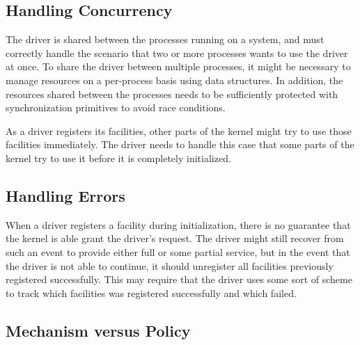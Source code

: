 

\subsection{Handling Concurrency}
The driver is shared between the processes running on a system, and must correctly handle the scenario that two or more processes wants to use the driver at once. To share the driver between multiple processes, it might be necessary to manage resources on a per-process basis using data structures. In addition, the resources shared between the processes needs to be sufficiently protected with synchronization primitives to avoid race conditions.

As a driver registers its facilities, other parts of the kernel might try to use those facilities immediately. The driver needs to handle this case that some parts of the kernel try to use it before it is completely initialized.



\subsection{Handling Errors}
When a driver registers a facility during initialization, there is no guarantee that the kernel is able grant the driver's request. The driver might still recover from such an event to provide either full or some partial service, but in the event that the driver is not able to continue, it should unregister all facilities previously registered successfully. This may require that the driver uses some sort of scheme to track which facilities was registered successfully and which failed. 



\subsection{Mechanism versus Policy}



